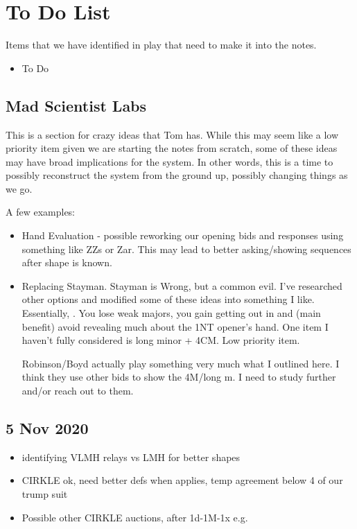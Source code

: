 \documentclass[tom-ari]{subfile}
\begin{document}
	
	\chapter{To Do List}
	
	Items that we have identified in play that need to make it into the notes.
	\begin{itemize}
		\item To Do
	\end{itemize}

	\section{Mad Scientist Labs}
	
	This is a section for crazy ideas that Tom has.  While this may seem like a low priority item given we are starting the notes from scratch, some of these ideas may have broad implications for the system.  In other words, this is a time to possibly reconstruct the system from the ground up, possibly changing things as we go.
	
	A few examples:
	
	\begin{itemize}
		\item Hand Evaluation - possible reworking our opening bids and responses using something like ZZs or Zar.  This may lead to better asking/showing sequences after shape is known.
		\item Replacing Stayman.  Stayman is Wrong, but a common evil.  I've researched other options and modified some of these ideas into something I like.  Essentially, \rightarrow{}.  You lose weak majors, you gain getting out in  and (main benefit) avoid revealing much about the 1NT opener's hand.  One item I haven't fully considered is long minor + 4CM.  Low priority item.
		
		 Robinson/Boyd actually play something very much what I outlined here.  I think they use other bids to show the 4M/long m.  I need to study further and/or reach out to them.
	\end{itemize}

	\section{5 Nov 2020}
	\begin{itemize}
		\item identifying VLMH relays vs LMH for better shapes
		\item CIRKLE ok, need better defs when applies, temp agreement below 4 of our trump suit
		\item Possible other CIRKLE auctions, after 1d-1M-1x e.g.
	\end{itemize}
\end{document}
